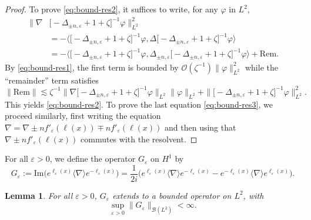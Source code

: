 \documentclass[12pt]{article}
\newcommand{\Teps}{{G_\varepsilon}}
\theoremstyle{plain}
\newtheorem{lemma}[theo]{Lemma}
\begin{document}
\begin{proof}
To prove \eqref{eq:bound-res2}, it suffices to write, for any $\varphi$ in $L^2$,
\begin{align*}
    \big\|\nabla&\big[-\Delta_{\pm n,\varepsilon}+1+\zeta\big]^{-1}\varphi\big\|^2_{L^2}\\
    &=-\big\langle\big[-\Delta_{\pm n,\varepsilon}+1+\zeta\big]^{-1}\varphi,\Delta\big[-\Delta_{\pm n,\varepsilon}+1+\zeta\big]^{-1}\varphi\big\rangle\\
    &=-\big\langle\big[-\Delta_{\pm n,\varepsilon}+1+\zeta\big]^{-1}\varphi,\Delta_{\pm n,\varepsilon}\big[-\Delta_{\pm n,\varepsilon}+1+\zeta\big]^{-1}\varphi\big\rangle+\mathrm{Rem}.
\end{align*}
By \eqref{eq:bound-res1}, the first term is bounded by $\mathcal{O}(\zeta^{-1})\|\varphi\|^2_{L^2}$  while the ``remainder'' term satisfies \begin{equation*}
    \|\mathrm{Rem}\|\lesssim \zeta^{-1}\big\|\nabla\big[-\Delta_{\pm n,\varepsilon}+1+\zeta\big]^{-1}\varphi\big\|_{L^2}\|\varphi\|_{L^2} + \|\big[-\Delta_{\pm n,\varepsilon}+1+\zeta\big]^{-1}\varphi\big\|^2_{L^2}.
\end{equation*}
This yields \eqref{eq:bound-res2}. To prove the last equation \eqref{eq:bound-res3}, we proceed similarly, first writing the equation $\nabla=\nabla\pm n f'_\varepsilon(\ell(x))\mp n f'_\varepsilon(\ell(x))$ and then using that $\nabla\pm n f'_\varepsilon(\ell(x))$ commutes with the resolvent.
	\end{proof}
	
	For all $\varepsilon>0$, we define the operator $\Teps$ on $H^1$ by
	    \begin{equation}\label{eq:defTeps}
	        \Teps:=\mathrm{Im}\big(e^{\ell_\varepsilon(x)} \langle\nabla\rangle e^{-\ell_\varepsilon(x)}\big)=\frac{1}{2i}\big(e^{\ell_\varepsilon(x)} \langle\nabla\rangle e^{-\ell_\varepsilon(x)}-e^{-\ell_\varepsilon(x)} \langle\nabla\rangle e^{\ell_\varepsilon(x)}\big).
	    \end{equation}
	    
	
	\begin{lemma}\label{lm:unif-bound}
	    For all $\varepsilon>0$, $\Teps$ extends to a bounded operator on $L^2$, with
	    \begin{equation*}
	        \sup_{\varepsilon>0}\|\Teps\|_{\mathcal{B}(L^2)}<\infty.
	    \end{equation*}
	\end{lemma}
	
\end{document}
